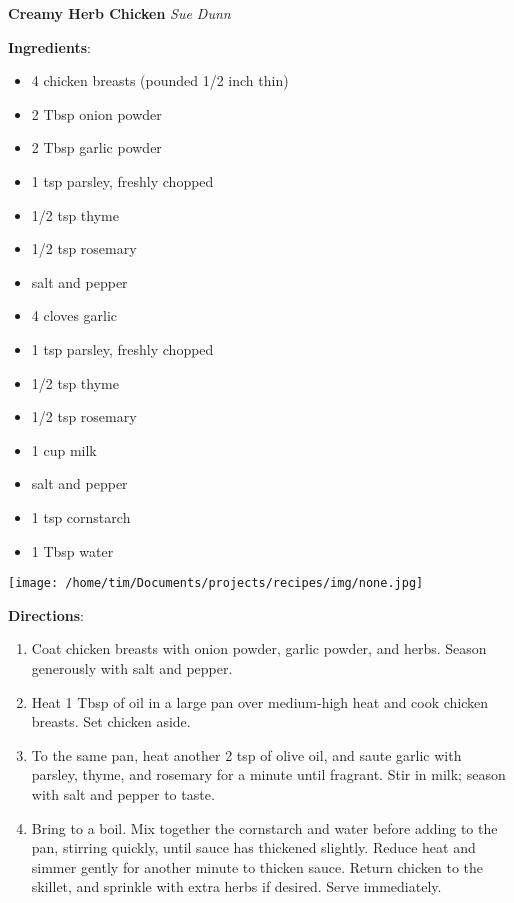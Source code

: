 \documentclass[11pt, twoside, openany]{book}
\begin{document}
\noindent\begin{minipage}[t]{\linewidth}%
{\Large\textbf{Creamy Herb Chicken}} \label{creamy-herb-chicken}\hfill\textit{Sue Dunn}\\
\noindent\begin{minipage}[t]{0.78\linewidth}%
\textbf{Ingredients}:\vspace{-3mm}
\begin{multicols}{2}
\begin{itemize}\setlength\itemsep{-1mm}
\item 4 chicken breasts (pounded 1/2 inch thin)
\item 2 Tbsp onion powder
\item 2 Tbsp garlic powder
\item 1 tsp parsley, freshly chopped
\item 1/2 tsp thyme
\item 1/2 tsp rosemary
\item salt and pepper
\item 4 cloves garlic
\item 1 tsp parsley, freshly chopped
\item 1/2 tsp thyme
\item 1/2 tsp rosemary
\item 1 cup milk
\item salt and pepper
\item 1 tsp cornstarch
\item 1 Tbsp water
\end{itemize}
\end{multicols}
\end{minipage}
\noindent\begin{minipage}[t]{0.18\linewidth}
\centering \strut\vspace*{-\baselineskip}\newline
\texttt{[image: /home/tim/Documents/projects/recipes/img/none.jpg]}\\
\end{minipage}\vspace{3mm}
\textbf{Directions}:
\vspace{-3mm}\begin{enumerate}\setlength\itemsep{-1mm}
\item Coat chicken breasts with onion powder, garlic powder, and herbs. Season generously with salt and pepper.
\item Heat 1 Tbsp of oil in a large pan over medium-high heat and cook chicken breasts. Set chicken aside.
\item To the same pan, heat another 2 tsp of olive oil, and saute garlic with parsley, thyme, and rosemary for a minute until fragrant. Stir in milk; season with salt and pepper to taste.
\item Bring to a boil. Mix together the cornstarch and water before adding to the pan, stirring quickly, until sauce has thickened slightly. Reduce heat and simmer gently for another minute to thicken sauce. Return chicken to the skillet, and sprinkle with extra herbs if desired. Serve immediately.
\end{enumerate}
\end{minipage}\vspace{8mm}
\end{document}
